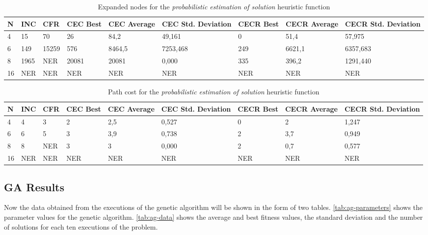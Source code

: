 \documentclass[]{llncs}
\begin{document}
\begin{table}[H]
    \caption{Expanded nodes for the \textit{probabilistic estimation of solution} heuristic function}
    \centering
    \resizebox{1 \textwidth}{!} { %
        \begin{tabular}{|l|l|l|l|l|l|l|l|l|}
            \hline
            N & INC & CFR & CEC Best & CEC Average & CEC Std. Deviation & CECR Best & CECR Average & CECR Std. Deviation \\ \hline
            4 & 15 & 70 & 26 & 84,2 & 49,161 & 0 & 51,4 & 57,975 \\
            6 & 149 & 15259 & 576 & 8464,5 & 7253,468 & 249 & 6621,1 & 6357,683 \\
            8 & 1965 & NER & 20081 & 20081 & 0,000 & 335 & 396,2 & 1291,440 \\
            16 & NER & NER & NER & NER & NER & NER & NER & NER \\ \hline         
    \end{tabular}
    } %
    \label{tab:probestimation-expanded}
\end{table}

\begin{table}[H]
    \caption{Path cost for the \textit{probabilistic estimation of solution} heuristic function}
    \centering
    \label{tab:probestimation-pathcost}
    \resizebox{1 \textwidth}{!} { %
        \begin{tabular}{|l|l|l|l|l|l|l|l|l|}
            \hline
            N & INC & CFR & CEC Best & CEC Average & CEC Std. Deviation & CECR Best & CECR Average & CECR Std. Deviation \\ \hline
            4 & 4 & 3 & 2 & 2,5 & 0,527 & 0 & 2 & 1,247 \\
            6 & 6 & 5 & 3 & 3,9 & 0,738 & 2 & 3,7 & 0,949 \\
            8 & 8 & NER & 3 & 3 & 0,000 & 2 & 0,7 &	0,577 \\
            16 & NER & NER & NER & NER  & NER & NER & NER  & NER \\ \hline        
    \end{tabular}
    } %
\end{table}
\subsection{GA Results}\label{gen_results}
Now the data obtained from the executions of the genetic algorithm will be shown in the form of two tables. \ref{tab:ag-parameters} shows the parameter values for the genetic algorithm. \ref{tab:ag-data} shows the average and best fitness values, the standard deviation and the number of solutions for each ten executions of the problem.
\end{document}

